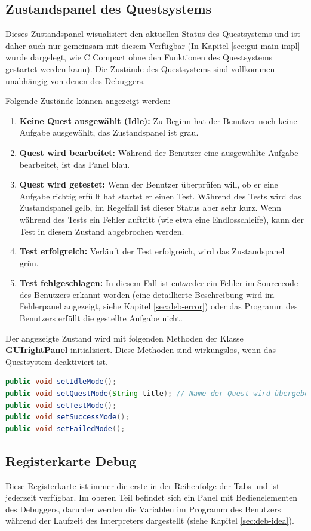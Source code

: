 \subsection{Zustandspanel des Questsystems}
Dieses Zustandspanel wisualisiert den aktuellen Status des Questsystems und ist daher auch nur gemeinsam mit diesem Verfügbar (In Kapitel \ref{sec:gui-main-impl} wurde dargelegt, wie C Compact ohne den Funktionen des Questsystems gestartet werden kann). Die Zustände des Questsystems sind vollkommen unabhängig von denen des Debuggers.

Folgende Zustände können angezeigt werden:
\begin{enumerate}
\item \textbf{Keine Quest ausgewählt (Idle):} Zu Beginn hat der Benutzer noch keine Aufgabe ausgewählt, das Zustandspanel ist grau.
\item \textbf{Quest wird bearbeitet:} Während der Benutzer eine ausgewählte Aufgabe bearbeitet, ist das Panel blau.
\item \textbf{Quest wird getestet:} Wenn der Benutzer überprüfen will, ob er eine Aufgabe richtig erfüllt hat startet er einen Test. Während des Tests wird das Zustandspanel gelb, im Regelfall ist dieser Status aber sehr kurz. Wenn während des Tests ein Fehler auftritt (wie etwa eine Endlosschleife), kann der Test in diesem Zustand abgebrochen werden.
\item \textbf{Test erfolgreich:} Verläuft der Test erfolgreich, wird das Zustandspanel grün.
\item \textbf{Test fehlgeschlagen:} In diesem Fall ist entweder ein Fehler im Sourcecode des Benutzers erkannt worden (eine detaillierte Beschreibung wird im Fehlerpanel angezeigt, siehe Kapitel \ref{sec:deb-error}) oder das Programm des Benutzers erfüllt die gestellte Aufgabe nicht.
\end{enumerate}

Der angezeigte Zustand wird mit folgenden Methoden der Klasse \textbf{GUIrightPanel} initialisiert. Diese Methoden sind wirkungslos, wenn das Questsystem deaktiviert ist.
\begin{lstlisting}[language=JAVA]
public void setIdleMode();
public void setQuestMode(String title); // Name der Quest wird übergeben
public void setTestMode();
public void setSuccessMode();
public void setFailedMode();
\end{lstlisting}

\subsection{Registerkarte \glqq{}Debug\grqq{}}
\label{sec:gui-main-right-reg-deb}
Diese Registerkarte ist immer die erste in der Reihenfolge der Tabs und ist jederzeit verfügbar. Im oberen Teil befindet sich ein Panel mit Bedienelementen des Debuggers, darunter werden die Variablen im Programm des Benutzers während der Laufzeit des Interpreters dargestellt (siehe Kapitel \ref{sec:deb-idea}).

